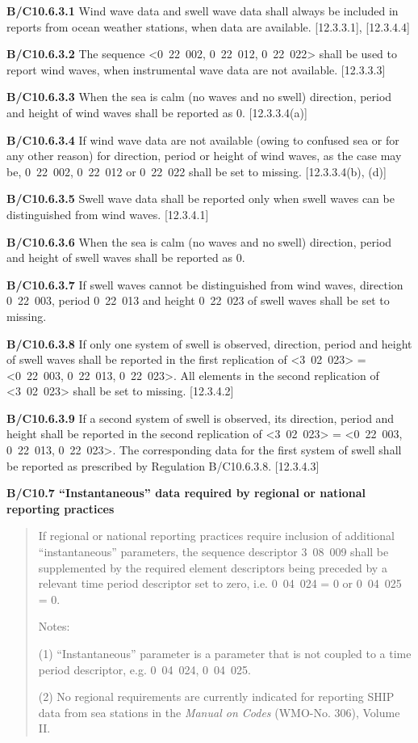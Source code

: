 \textbf{B/C10.6.3.1} Wind wave data and swell wave data shall always be included in reports from ocean weather stations, when data are available. {[}12.3.3.1{]}, {[}12.3.4.4{]}

\textbf{B/C10.6.3.2} The sequence \textless0~22~002, 0~22~012, 0~22~022\textgreater{} shall be used to report wind waves, when instrumental wave data are not available. {[}12.3.3.3{]}

\textbf{B/C10.6.3.3} When the sea is calm (no waves and no swell) direction, period and height of wind waves shall be reported as 0. {[}12.3.3.4(a){]}

\textbf{B/C10.6.3.4} If wind wave data are not available (owing to confused sea or for any other reason) for direction, period or height of wind waves, as the case may be, 0~22~002, 0~22~012 or 0~22~022 shall be set to missing. {[}12.3.3.4(b), (d){]}

\textbf{B/C10.6.3.5} Swell wave data shall be reported only when swell waves can be distinguished from wind waves. {[}12.3.4.1{]}

\textbf{B/C10.6.3.6} When the sea is calm (no waves and no swell) direction, period and height of swell waves shall be reported as 0.

\textbf{B/C10.6.3.7} If swell waves cannot be distinguished from wind waves, direction 0~22~003, period 0~22~013 and height 0~22~023 of swell waves shall be set to missing.

\textbf{B/C10.6.3.8} If only one system of swell is observed, direction, period and height of swell waves shall be reported in the first replication of \textless3~02~023\textgreater{} = \textless0~22~003, 0~22~013, 0~22~023\textgreater. All elements in the second replication of \textless3~02~023\textgreater{} shall be set to missing. {[}12.3.4.2{]}

\textbf{B/C10.6.3.9} If a second system of swell is observed, its direction, period and height shall be reported in the second replication of \textless3~02~023\textgreater{} = \textless0~22~003, 0~22~013, 0~22~023\textgreater. The corresponding data for the first system of swell shall be reported as prescribed by Regulation B/C10.6.3.8. {[}12.3.4.3{]}

\textbf{B/C10.7 ``Instantaneous'' data required by regional or national reporting practices}

\begin{quote}
If regional or national reporting practices require inclusion of additional ``instantaneous'' parameters, the sequence descriptor 3~08~009 shall be supplemented by the required element descriptors being preceded by a relevant time period descriptor set to zero, i.e. 0~04~024 = 0 or 0~04~025 = 0.

Notes:

(1) ``Instantaneous'' parameter is a parameter that is not coupled to a time period descriptor, e.g. 0~04~024, 0~04~025.

(2) No regional requirements are currently indicated for reporting SHIP data from sea stations in the \emph{Manual on Codes} (WMO-No. 306), Volume II.
\end{quote}

